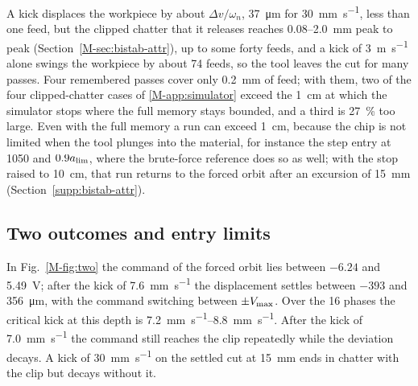 A kick displaces the workpiece by about $\Delta v/\omega_n$, \SI{37}{\micro\metre} for \SI{30}{\milli\metre\per\second}, less than one feed, but the clipped chatter that it releases reaches 0.08--\SI{2.0}{\milli\metre} peak to peak (Section~\ref{M-sec:bistab-attr}), up to some forty feeds, and a kick of \SI{3}{\metre\per\second} alone swings the workpiece by about 74 feeds, so the tool leaves the cut for many passes. Four remembered passes cover only \SI{0.2}{\milli\metre} of feed; with them, two of the four clipped-chatter cases of \ref{M-app:simulator} exceed the \SI{1}{\centi\metre} at which the simulator stops where the full memory stays bounded, and a third is \SI{27}{\percent} too large. Even with the full memory a run can exceed \SI{1}{\centi\metre}, because the chip is not limited when the tool plunges into the material, for instance the step entry at \SI{1050}{\rpm} and $0.9a_{\lim}$, where the brute-force reference does so as well; with the stop raised to \SI{10}{\centi\metre}, that run returns to the forced orbit after an excursion of \SI{15}{\milli\metre} (Section~\ref{supp:bistab-attr}).

\subsection{Two outcomes and entry limits}\label{supp:bistab-map}

In Fig.~\ref{M-fig:two} the command of the forced orbit lies between $-6.24$ and \SI{5.49}{\volt}; after the kick of \SI{7.6}{\milli\metre\per\second} the displacement settles between $-393$ and \SI{356}{\micro\metre}, with the command switching between $\pm V_{\max}$. Over the 16 phases the critical kick at this depth is \SIrange{7.2}{8.8}{\milli\metre\per\second}. After the kick of \SI{7.0}{\milli\metre\per\second} the command still reaches the clip repeatedly while the deviation decays. A kick of \SI{30}{\milli\metre\per\second} on the settled cut at \SI{15}{\milli\metre} ends in chatter with the clip but decays without it.

